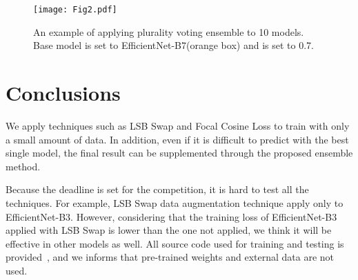 \documentclass[runningheads]{llncs}
\begin{document}
\begin{figure}
\centering
\texttt{[image: Fig2.pdf]}
\caption{An example of applying plurality voting ensemble to 10 models. Base model  is set to EfficientNet-B7(orange box) and  is set to 0.7.}
\label{fig:ensemble}
\end{figure}

\section{Conclusions}
We apply techniques such as LSB Swap and Focal Cosine Loss to train with only a small amount of data. In addition, even if it is difficult to predict with the best single model, the final result can be supplemented through the proposed ensemble method.

Because the deadline is set for the competition, it is hard to test all the techniques. For example, LSB Swap data augmentation technique apply only to EfficientNet-B3. However, considering that the training loss of EfficientNet-B3 applied with LSB Swap is lower than the one not applied, we think it will be effective in other models as well. All source code used for training and testing is provided~\cite{kbjcode}, and we informs that pre-trained weights and external data are not used.

\clearpage


\end{document}

